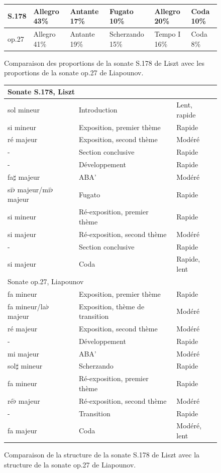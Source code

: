 \begin{figure}[!ht]
  \begin{bigcenter}
    \scalebox{0.925} {
\begin{tabular}{|l||l|l|l|l|l|}
 \hline
S.178 & Allegro 43\% & Antante 17\% & Fugato 10\% & Allegro 20\% & Coda 10\%\\
 \hline
 \hline
op.27 & Allegro 41\% & Antante 19\% & Scherzando 15\% & Tempo I 16\% & Coda 8\%\\
 \hline
\end{tabular}
    }
  \end{bigcenter}
  \caption{\label{sonate-liapounov-list1} Comparaison des proportions de la sonate S.178 de Liszt avec les proportions de la sonate op.27 de Liapounov.}
\end{figure}

\begin{figure}[!ht]
  \begin{bigcenter}
    \scalebox{0.925} {
\begin{tabular}{|l|l|l|}
 \hline
\multicolumn{3}{|l|}{Sonate S.178, Liszt}\\
 \hline
sol mineur & Introduction & Lent, rapide\\
si mineur & Exposition, premier thème & Rapide\\
ré majeur & Exposition, second thème & Modéré\\
- & Section conclusive & Rapide\\
- & Développement & Rapide\\
fa$\sharp$ majeur & ABA' & Modéré\\
si$\flat$ majeur/mi$\flat$ majeur & Fugato & Rapide\\
si mineur & Ré-exposition, premier thème & Rapide\\
si majeur & Ré-exposition, second thème & Modéré\\
- & Section conclusive & Rapide\\
si majeur & Coda & Rapide, lent\\
 \hline
 \hline
\multicolumn{3}{|l|}{Sonate op.27, Liapounov}\\
 \hline
fa mineur & Exposition, premier thème & Rapide\\
fa mineur/la$\flat$ majeur & Exposition, thème de transition & Modéré\\
ré majeur & Exposition, second thème & Modéré \\
- & Développement & Rapide\\
mi majeur & ABA' & Modéré\\
sol$\sharp$ mineur & Scherzando & Rapide\\
fa mineur & Ré-exposition, premier thème & Rapide\\
ré$\flat$ majeur & Ré-exposition, second thème & Modéré\\
- & Transition & Rapide\\
fa majeur & Coda & Modéré, lent\\
 \hline
\end{tabular}
    }
  \end{bigcenter}
  \caption{\label{sonate-liapounov-list2} Comparaison de la structure de la sonate S.178 de Liszt avec la structure de la sonate op.27 de Liapounov.}
\end{figure}

